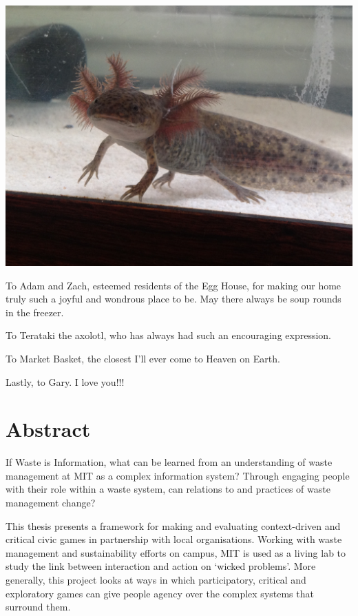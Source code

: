 \documentclass[nofonts,nols,justified,nobib]{tufte-book}
\begin{document}
\begin{marginfigure}
\includegraphics[width=\textwidth]{img/1/terataki.jpg}
\end{marginfigure}

To Adam and Zach, esteemed residents of the Egg House, for making our home truly such a joyful and wondrous place to be. May there always be soup rounds in the freezer.

To Terataki the axolotl, who has always had such an encouraging expression.

To Market Basket, the closest I'll ever come to Heaven on Earth.

Lastly, to Gary. I love you!!!


\newpage

\chapter*{Abstract}

If Waste is Information, what can be learned from an understanding of waste management at MIT as a complex information system? Through engaging people with their role within a waste system, can relations to and practices of waste management change? 

This thesis presents a framework for making and evaluating context-driven and critical civic games in partnership with local organisations. Working with waste management and sustainability efforts on campus, MIT is used as a living lab to study the link between interaction and action on `wicked problems'. More generally, this project looks at ways in which participatory, critical and exploratory games can give people agency over the complex systems that surround them. 
\end{document}
